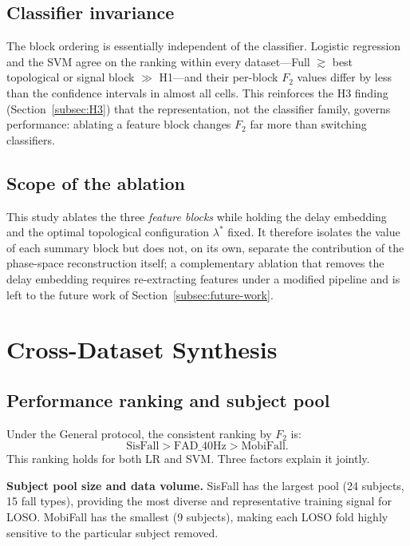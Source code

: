 \subsection{Classifier invariance}

The block ordering is essentially independent of the classifier.  Logistic regression
and the SVM agree on the ranking within every dataset---Full $\gtrsim$ best topological
or signal block $\gg$ H1---and their per-block $F_2$ values differ by less than the
confidence intervals in almost all cells.  This reinforces the H3 finding
(Section~\ref{subsec:H3}) that the representation, not the classifier family, governs
performance: ablating a feature block changes $F_2$ far more than switching classifiers.

\subsection{Scope of the ablation}

This study ablates the three \emph{feature blocks} while holding the delay embedding
and the optimal topological configuration $\lambda^*$ fixed.  It therefore isolates the
value of each summary block but does not, on its own, separate the contribution of the
phase-space reconstruction itself; a complementary ablation that removes the delay
embedding requires re-extracting features under a modified pipeline and is left to the
future work of Section~\ref{subsec:future-work}.

\section{Cross-Dataset Synthesis}
\label{subsec:synthesis}

\subsection{Performance ranking and subject pool}

Under the General protocol, the consistent ranking by $F_2$ is:
\[
  \text{SisFall} > \text{FAD\_40Hz} > \text{MobiFall.}
\]
This ranking holds for both LR and SVM.  Three factors explain it jointly.

\textbf{Subject pool size and data volume.}  SisFall has the largest pool (24 subjects,
15 fall types), providing the most diverse and representative training signal for
LOSO.  MobiFall has the smallest (9 subjects), making each LOSO fold highly sensitive
to the particular subject removed.


